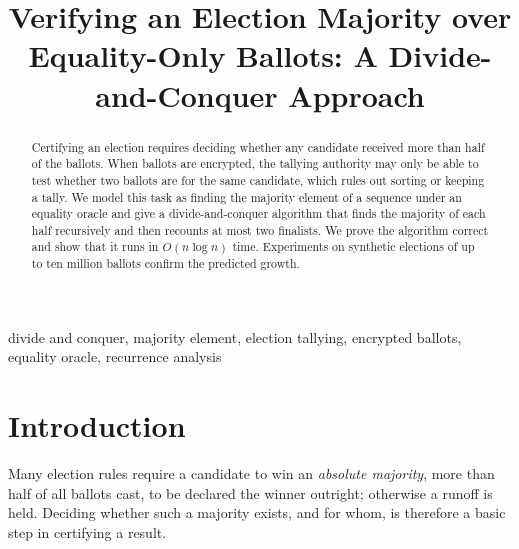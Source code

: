 \documentclass[conference]{IEEEtran}
\begin{document}
\title{Verifying an Election Majority over Equality-Only Ballots: A Divide-and-Conquer Approach}

\author{
\and
{}
}

\maketitle

\begin{abstract}
Certifying an election requires deciding whether any candidate received more
than half of the ballots. When ballots are encrypted, the tallying authority
may only be able to test whether two ballots are for the same candidate, which
rules out sorting or keeping a tally. We model this task as finding the
majority element of a sequence under an equality oracle and give a
divide-and-conquer algorithm that finds the majority of each half recursively
and then recounts at most two finalists. We prove the algorithm correct and
show that it runs in $O(n\log n)$ time. Experiments on synthetic elections of
up to ten million ballots confirm the predicted growth.
\end{abstract}

\begin{IEEEkeywords}
divide and conquer, majority element, election tallying, encrypted ballots,
equality oracle, recurrence analysis
\end{IEEEkeywords}

\section{Introduction}

Many election rules require a candidate to win an \emph{absolute majority},
more than half of all ballots cast, to be declared the winner outright;
otherwise a runoff is held. Deciding whether such a majority exists, and for
whom, is therefore a basic step in certifying a result.
\end{document}

